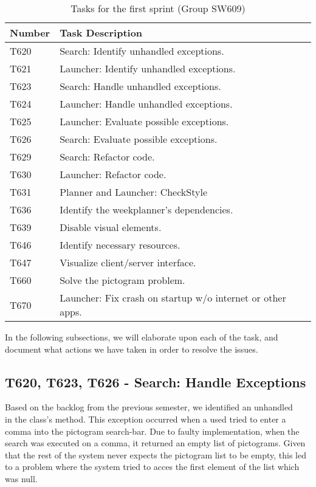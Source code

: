\begin{table}[H]
\centering
\begin{tabular}{|l|l|}
\hline
Number 			& Task Description 											\\\hline
T620  			& Search: Identify unhandled exceptions.                 	\\\hline
T621    	   	& Launcher: Identify unhandled exceptions. 					\\\hline 
T623	       	& Search: Handle unhandled exceptions.                 		\\\hline
T624    	   	& Launcher: Handle unhandled exceptions.  					\\\hline
T625   	   		& Launcher: Evaluate possible exceptions.        			\\\hline
T626   	   		& Search: Evaluate possible exceptions.                		\\\hline
T629  	   		& Search: Refactor code.			   						\\\hline
T630       		& Launcher: Refactor code.                 					\\\hline
T631       		& Planner and Launcher: CheckStyle                 			\\\hline
T636			& Identify the weekplanner's dependencies.					\\\hline
T639       		& Disable visual elements.                 					\\\hline
T646       		& Identify necessary resources.                 			\\\hline
T647       		& Visualize client/server interface.                 		\\\hline 
T660       		& Solve the pictogram problem.                 				\\\hline
T670       		& Launcher: Fix crash on startup w/o internet or other apps.\\\hline
\end{tabular}
\caption{Tasks for the first sprint (Group SW609)}
\label{S01:Tasks}  
\end{table}

In the following subsections, we will elaborate upon each of the task, and
document what actions we have taken in order to resolve the issues.

\subsection{T620, T623, T626 - Search: Handle Exceptions}
Based on the backlog from the previous semester, we identified an unhandled
\\ in the  class's
 method. This exception occurred when a used tried to enter a
comma into the pictogram search-bar. Due to faulty implementation, when the
search was executed on a comma, it returned an empty list of pictograms. Given
that the rest of the system never expects the pictogram list to be empty, this
led to a problem where the system tried to acces the first element of the list
which was null.\nl

